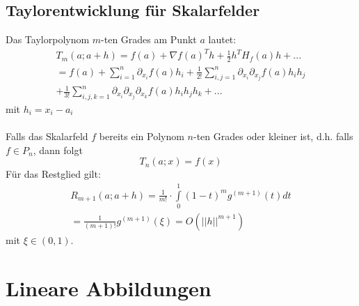 \documentclass[a4paper,twocolumn,10pt]{article}
\begin{document}
\subsection{Taylorentwicklung für Skalarfelder}
Das Taylorpolynom $m$-ten Grades am Punkt $a$ lautet:
\begin{equation*}
\begin{split}T_m(a;a+h)=f(a)+\nabla f(a)^T h+\frac{1}{2}h^TH_f(a) h+... \\ = f(a)+\sum\limits_{i=1}^{n}\partial_{x_i}f(a)h_i+\frac{1}{2!}\sum\limits_{i,j=1}^{n}\partial_{x_i}\partial_{x_j}f(a)h_ih_j \\ +\frac{1}{3!}\sum\limits_{i,j,k=1}^{n}\partial_{x_i}\partial_{x_j}\partial_{x_k}f(a)h_ih_jh_k+...\end{split}
\end{equation*}
mit $h_i=x_i-a_i$\\\\
Falls das Skalarfeld $f$ bereits ein Polynom $n$-ten Grades oder kleiner ist, d.h. falls $f\in P_n$, dann folgt
\begin{equation*}
T_n(a;x)=f(x)
\end{equation*}
Für das Restglied gilt:\\
\begin{equation*}
\begin{split}R_{m+1}(a;a+h)=\frac{1}{m!}\cdot \int\limits_{0}^{1}(1-t)^mg^{(m+1)}(t)dt \\ = \frac{1}{(m+1)!}g^{(m+1)}(\xi)=O(||h||^{m+1})\end{split}
\end{equation*}
mit $\xi\in (0,1)$.

\section{Lineare Abbildungen}
\end{document}
